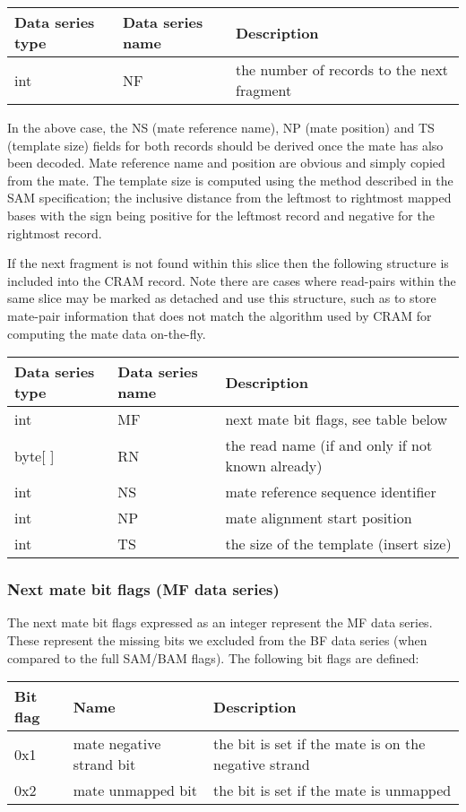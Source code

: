 \documentclass[a4paper]{article}
\begin{document}
\begin{tabular}{|>{\raggedright}p{68pt}|>{\raggedright}p{115pt}|>{\raggedright}p{228pt}|}
\hline
\textbf{Data series type} & \textbf{Data series name} & \textbf{Description}\tabularnewline
\hline
int & NF & the number of records to the next fragment\tabularnewline
\hline
\end{tabular}

In the above case, the NS (mate reference name), NP (mate position) and TS (template size) fields for both records should be derived once the mate has also been decoded.
Mate reference name and position are obvious and simply copied from the mate.
The template size is computed using the method described in the SAM specification; the inclusive distance from the leftmost to rightmost mapped bases with the sign being positive for the leftmost record and negative for the rightmost record.

If the next fragment is not found within this slice then the following structure is included into the CRAM record.
Note there are cases where read-pairs within the same slice may be marked as detached and use this structure, such as to store mate-pair information that does not match the algorithm used by CRAM for computing the mate data on-the-fly.

\begin{tabular}{|>{\raggedright}p{66pt}|>{\raggedright}p{117pt}|>{\raggedright}p{228pt}|}
\hline
\textbf{Data series type} & \textbf{Data series name} & \textbf{Description}\tabularnewline
\hline
int & MF & next mate bit flags, see table below\tabularnewline
\hline
byte[ ] & RN & the read name (if and only if not known already)\tabularnewline
\hline
int & NS & mate reference sequence identifier \tabularnewline
\hline
int & NP & mate alignment start position \tabularnewline
\hline
int & TS & the size of the template (insert size)\tabularnewline
\hline
\end{tabular}

\subsubsection*{Next mate bit flags (MF data series)}

The next mate bit flags expressed as an integer represent the MF data series.
These represent the missing bits we excluded from the BF data series (when compared to the full SAM/BAM flags).
The following bit flags are defined:

\begin{tabular}{|>{\raggedright}p{47pt}|>{\raggedright}p{134pt}|>{\raggedright}p{250pt}|}
\hline
\textbf{Bit flag} & \textbf{Name} & \textbf{Description}\tabularnewline
\hline
0x1 & mate negative strand bit & the bit is set if the mate is on the negative
strand\tabularnewline
\hline
0x2 & mate unmapped bit & the bit is set if the mate is unmapped\tabularnewline
\hline
\end{tabular}
\end{document}
